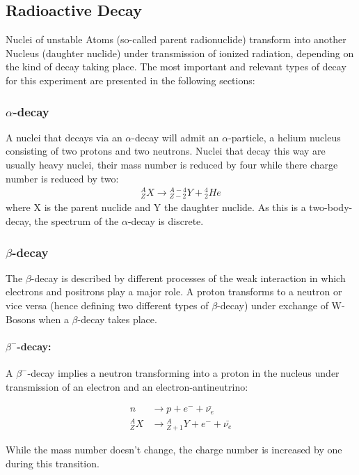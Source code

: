 \documentclass[12pt]{article}
\begin{document}
\subsection{Radioactive Decay}
Nuclei of unstable Atoms (so-called parent radionuclide) transform into another Nucleus (daughter nuclide) under transmission of ionized radiation, depending on the kind of decay taking place. The most important and relevant types of decay for this experiment are presented in the following sections:

\subsubsection{$\alpha$-decay \label{alpha}}

A nuclei that decays via an $\alpha$-decay will admit an $\alpha$-particle, a helium nucleus consisting of two protons and two neutrons. Nuclei that decay this way are usually heavy nuclei, their mass number is reduced by four while there charge number is reduced by two:
\begin{align}
{}_Z^A X \rightarrow {}_{Z-2}^{A-4} Y + {}^4_2He
\end{align}
where X is the parent nuclide and Y the daughter nuclide. As this is a  two-body-decay, the spectrum of the $\alpha$-decay is discrete.
\subsubsection{$\beta$-decay \label{beta}}
The $\beta$-decay is described by different processes of the weak interaction
in which electrons and positrons play a major role. A proton transforms to a neutron or vice versa (hence defining two different types of $\beta$-decay) under exchange of W-Bosons when a $\beta$-decay takes place.


\paragraph*{$\beta^-$-decay:} 
A $\beta^-$-decay implies a neutron transforming into a proton in the nucleus under transmission of an electron and an electron-antineutrino:

\begin{align*}
n &\rightarrow p + e^- + \bar{\nu_e}\\
{}_Z^A X &\rightarrow {}_{Z+1}^A Y + e^- + \bar{\nu_e}
\end{align*}

While the mass number doesn't change, the charge number is increased by one during this transition.
\end{document}

